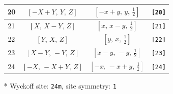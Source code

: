 \documentclass[fleqn,8pt]{jsarticle}
\begin{document}
\begin{longtable}{cccc}
20 & $\left[ - X + Y,\, Y,\, Z \right]$ & $\left[ - x + y,\, y,\, \frac{1}{2} \right]$ & {\tt [20]} \\ \hline
21 & $\left[ X,\, X - Y,\, Z \right]$ & $\left[ x,\, x - y,\, \frac{1}{2} \right]$ & {\tt [21]} \\ \hline
22 & $\left[ Y,\, X,\, Z \right]$ & $\left[ y,\, x,\, \frac{1}{2} \right]$ & {\tt [22]} \\ \hline
23 & $\left[ X - Y,\, - Y,\, Z \right]$ & $\left[ x - y,\, - y,\, \frac{1}{2} \right]$ & {\tt [23]} \\ \hline
24 & $\left[ - X,\, - X + Y,\, Z \right]$ & $\left[ - x,\, - x + y,\, \frac{1}{2} \right]$ & {\tt [24]} \\
\end{longtable}
* Wyckoff site: {\tt 24m}, site symmetry: {\tt 1}
\renewcommand{\arraystretch}{1.2}
\end{document}
